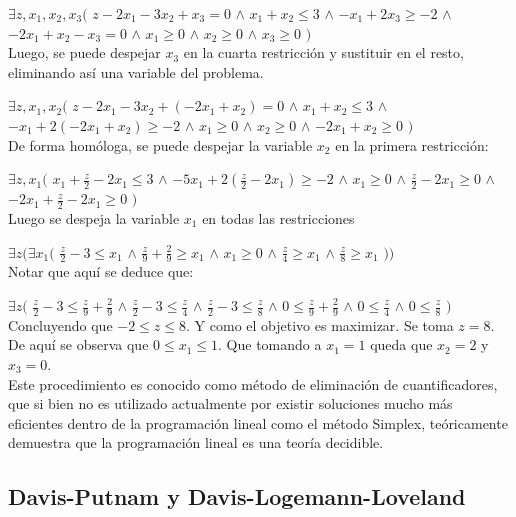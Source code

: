 \documentclass[12pt]{report}
\begin{document}
$\exists z,x_1,x_2,x_3 ($
$z - 2x_1 - 3x_2 + x_3 = 0$ $\land$
$ x_1 + x_2 \leq  3 $ $\land$
$ -x_1 + 2x_3 \geq  -2 $ $\land$
$ -2x_1 + x_2 - x_3 = 0 $ $\land$
$ x_1\geq  0 $ $\land$ 
$ x_2\geq  0 $ $\land$ 
$ x_3\geq  0 $ 
$)$\\

Luego, se puede despejar $x_3$ en la cuarta restricción y sustituir en el resto, eliminando así una variable del problema.

$\exists z,x_1,x_2($
$z - 2x_1 - 3x_2 + (-2x_1 + x_2) = 0$ $\land$
$ x_1 + x_2 \leq  3 $ $\land$
$ -x_1 + 2(-2x_1 + x_2) \geq  -2 $ $\land$
$ x_1\geq  0 $ $\land$ 
$ x_2\geq  0 $ $\land$ 
$ -2x_1 + x_2\geq  0 $ 
$)$\\

De forma homóloga, se puede despejar la variable $x_2$ en la primera restricción:

$\exists z,x_1 ($
$ x_1 + \frac z 2 -2x_1 \leq  3 $ $\land$
$ -5x_1 + 2(\frac z 2 -2x_1) \geq  -2 $ $\land$
$ x_1\geq  0 $ $\land$ 
$ \frac z 2 -2x_1 \geq  0 $ $\land$ 
$ -2x_1 + \frac z 2 -2x_1 \geq  0 $
$)$\\

Luego se despeja la variable $x_1$ en todas las restricciones

$\exists z (\exists x_1 ($
$ \frac z 2 - 3 \leq   x_1 $ $\land$
$ \frac z 9 + \frac 2 9 \geq  x_1 $ $\land$
$ x_1\geq  0 $ $\land$ 
$ \frac z 4 \geq  x_1 $ $\land$ 
$ \frac z 8 \geq  x_1 $ $))$\\

Notar que aquí se deduce que:

$\exists z ($
$ \frac z 2 - 3 \leq   \frac z 9 + \frac 2 9 $ $\land$
$ \frac z 2 - 3 \leq  \frac z 4  $ $\land$
$ \frac z 2 - 3 \leq  \frac z 8 $ $\land$
$ 0 \leq   \frac z 9 + \frac 2 9 $ $\land$
$ 0 \leq  \frac z 4  $ $\land$
$ 0 \leq  \frac z 8 $ 
$)$\\

Concluyendo que $-2\leq  z \leq  8$. Y como el objetivo es maximizar. Se toma $z=8$. De aquí se observa que $0\leq  x_1 \leq 1$. Que tomando a $x_1=1$ queda que $x_2=2$ y $x_3 = 0$.\\

Este procedimiento es conocido como método de eliminación de cuantificadores, que si bien no es utilizado actualmente por existir soluciones mucho más eficientes dentro de la programación lineal como el método Simplex, teóricamente demuestra que la programación lineal es una teoría decidible.

\subsection{Davis-Putnam y Davis-Logemann-Loveland}
\end{document}
